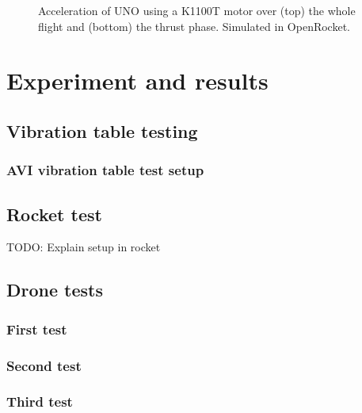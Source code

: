 \documentclass[draft]{report}
\begin{document}
\begin{figure}[H]
  
  
  \caption{Acceleration of UNO using a K1100T motor over (top) the whole flight and (bottom) the thrust phase. Simulated in OpenRocket.}
  \label{fig:openrocket-k-acceleration}
\end{figure}


\chapter{Experiment and results}

\section{Vibration table testing}
\subsection{AVI vibration table test setup}



\section{Rocket test}

TODO: Explain setup in rocket


\section{Drone tests}
\subsection{First test}
\subsection{Second test}
\subsection{Third test}

\end{document}
